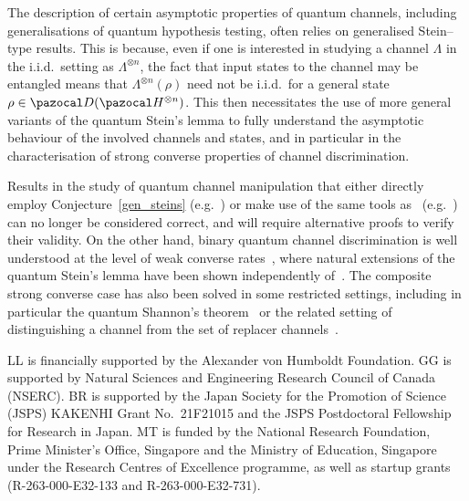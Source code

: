 \documentclass[11pt,notitlepage,tightenlines,nofootinbib,superscriptaddress]{revtex4-1}
\begin{document}
The description of certain asymptotic properties of quantum channels, including generalisations of quantum hypothesis testing, often relies on generalised Stein--type results. This is because, even if one is interested in studying a channel $\Lambda$ in the i.i.d.\ setting as $\Lambda^{\otimes n}$, the fact that input states to the channel may be entangled means that $\Lambda^{\otimes n}(\rho)$ need not be i.i.d.\ for a general state $\rho \in \D(\HH^{\otimes n})$. This then necessitates the use of more general variants of the quantum Stein's lemma to fully understand the asymptotic behaviour of the involved channels and states, and in particular in the characterisation of strong converse properties of channel discrimination.

Results in the study of quantum channel manipulation that either directly employ Conjecture~\ref{gen_steins} (e.g.~\cite[Theorem~6]{Gour-Winter}) or make use of the same tools as~\cite{Brandao2010} (e.g.~\cite[Theorem~12]{fang_preprint}) can no longer be considered correct, and will require alternative proofs to verify their validity.
On the other hand, binary quantum channel discrimination is well understood at the level of weak converse rates~\cite{Berta2018,wang_2019-4,Fang2020}, where natural extensions of the quantum Stein's lemma have been shown independently of~\cite{Brandao2010}. The composite strong converse case has also been solved in some restricted settings, including in particular the quantum Shannon's theorem~\cite{Bennett2014,Bennett2002,Berta2011} or the related setting of distinguishing a channel from the set of replacer channels~\cite{Cooney2016}. 


\begin{acknowledgments}
LL is financially supported by the Alexander von Humboldt Foundation. GG is supported by Natural Sciences and Engineering Research Council of Canada (NSERC). BR is supported by the Japan Society for the Promotion of Science (JSPS) KAKENHI Grant No.\ 21F21015 and the JSPS Postdoctoral Fellowship for Research in Japan. MT is funded by the National Research Foundation, Prime Minister’s Office, Singapore and the Ministry of Education, Singapore under the Research Centres of Excellence programme, as well as startup grants (R-263-000-E32-133 and R-263-000-E32-731).
\end{acknowledgments}




\end{document}
